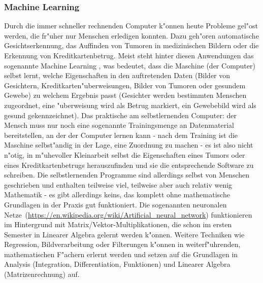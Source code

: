 \subsubsection{Machine Learning}
Durch die immer schneller rechnenden Computer k"onnen heute Probleme gel"ost werden, die fr"uher nur Menschen erledigen konnten. Dazu geh"oren automatische Gesichtserkennung, das Auffinden von Tumoren in medizinischen Bildern oder die Erkennung von Kreditkartenbetrug. Meist steht hinter diesen Anwendungen das sogenannte \glqq Machine Learning \grqq, was bedeutet, dass die Maschine (der Computer) selbst lernt, welche Eigenschaften in den auftretenden Daten (Bilder von Gesichtern, Kreditkarten"uberweisungen, Bilder von Tumoren oder gesundem Gewebe) zu welchem Ergebnis passt (Gesichter werden bestimmten Menschen zugeordnet, eine "uberweisung wird als Betrug markiert, ein Gewebebild wird als gesund gekennzeichnet). Das praktische am selbstlernenden Computer: der Mensch muss nur noch eine sogenannte Trainingsmenge an Datenmaterial bereitstellen, an der der Computer lernen kann - nach dem Training ist die Maschine selbst"andig in der Lage, eine Zuordnung zu machen - es ist also nicht n"otig, in m"uhevoller Kleinarbeit selbst die Eigenschaften eines Tumors oder eines Kreditkartenbetrugs herauszufinden und sie die entsprechende Software zu schreiben.
Die selbstlernenden Programme sind allerdings selbst von Menschen geschrieben und enthalten teilweise viel, teilweise aber auch relativ wenig Mathematik - es gibt allerdings keins, das komplett ohne mathematische Grundlagen in der Praxis gut funktioniert. Die sogenannten \glqq neuronalen Netze\grqq \ (\url{https://en.wikipedia.org/wiki/Artificial_neural_network}) funktionieren im Hintergrund mit Ma\-trix/\-Vektor-\-Multiplikationen, die schon im ersten Semester in Linearer Algebra gelernt werden k"onnen. Weitere Techniken wie Regression, Bildverarbeitung oder Filterungen k"onnen in weiterf"uhrenden, mathematischen F"achern erlernt werden und setzen auf die Grundlagen in Analysis (Integration, Differentiation, Funktionen) und Linearer Algebra (Matrizenrechnung) auf.


